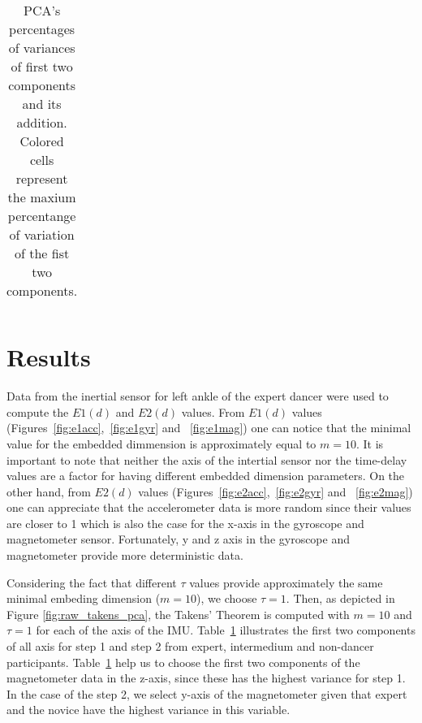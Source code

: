 \documentclass{sigchi}
\begin{document}
\begin{table}
\begin{tabular}{l c c c c c c }
\bottomrule
\end{tabular}

  \caption{PCA's percentages of variances of first two components and its addition.
  Colored cells represent the maxium percentange of variation of the fist two components.}
  \label{tab:table1}
\end{table}




\section{Results}



Data from the inertial sensor for left ankle of the expert dancer were used
to compute the $E1(d)$ and $E2(d)$ values. From $E1(d)$ values 
(Figures~\ref{fig:e1acc},~\ref{fig:e1gyr} and ~\ref{fig:e1mag})
one can notice that the minimal value for the embedded dimmension is approximately
equal to $m=10$. It is important to note that neither the axis of the intertial sensor 
nor the time-delay values are a factor for having different embedded dimension parameters.
On the other hand, from $E2(d)$ values (Figures~\ref{fig:e2acc},~\ref{fig:e2gyr} and ~\ref{fig:e2mag})
one can appreciate that the accelerometer data is more random since their values are closer to 1
which is also the case for the x-axis in the gyroscope and magnetometer sensor. 
Fortunately, y and z axis in the gyroscope and magnetometer provide more deterministic data.

Considering the fact that different $\tau$ values provide approximately the same minimal embeding dimension ($m=10$),
we choose $\tau = 1$. Then, as depicted in Figure \ref{fig:raw_takens_pca}, the Takens' Theorem is computed 
with $m=10$ and $\tau = 1$ for each of the axis of the IMU. 
Table~\ref{tab:table1} illustrates the first two components of all axis for step 1 and step 2 from
expert, intermedium and non-dancer participants.
Table~\ref{tab:table1} help us to choose the first two components of the magnetometer data in the z-axis,
since these has the highest variance for step 1. In the case of the step 2, we select y-axis of the magnetometer 
given that expert and the novice have the highest variance in this variable.
\end{document}
